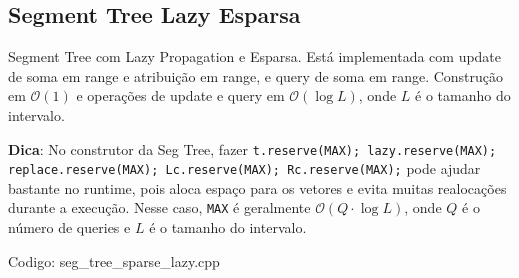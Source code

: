 \documentclass[10pt, a4paper, oneside]{book}
\begin{document}
\subsection{Segment Tree Lazy Esparsa}


Segment Tree com Lazy Propagation e Esparsa. Está implementada com update de soma em range e atribuição em range, e query de soma em range. Construção em $\mathcal{O}(1)$ e operações de update e query em $\mathcal{O}(\log L)$, onde $L$ é o tamanho do intervalo.



\textbf{Dica}: No construtor da Seg Tree, fazer \texttt{t.reserve(MAX); lazy.reserve(MAX); replace.reserve(MAX); Lc.reserve(MAX); Rc.reserve(MAX);} pode ajudar bastante no runtime, pois aloca espaço para os vetores e evita muitas realocações durante a execução. Nesse caso, \texttt{MAX} é geralmente $\mathcal{O}(Q \cdot \log L)$, onde $Q$ é o número de queries e $L$ é o tamanho do intervalo.
\hfill

Codigo: seg\_tree\_sparse\_lazy.cpp
\end{document}
